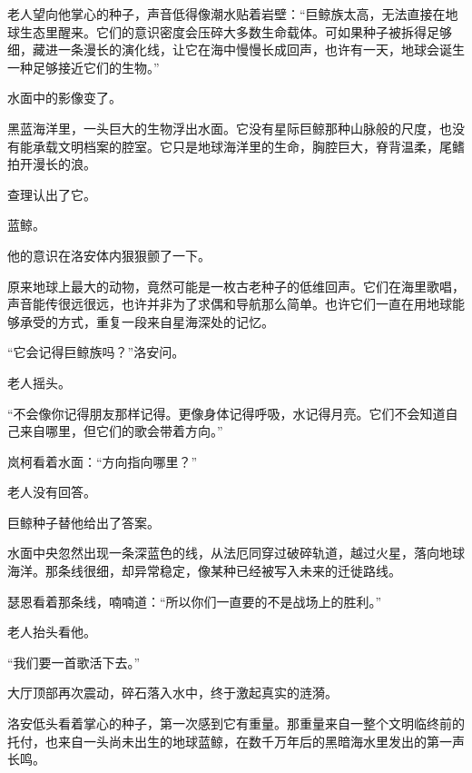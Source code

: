 老人望向他掌心的种子，声音低得像潮水贴着岩壁：“巨鲸族太高，无法直接在地球生态里醒来。它们的意识密度会压碎大多数生命载体。可如果种子被拆得足够细，藏进一条漫长的演化线，让它在海中慢慢长成回声，也许有一天，地球会诞生一种足够接近它们的生物。”

水面中的影像变了。

黑蓝海洋里，一头巨大的生物浮出水面。它没有星际巨鲸那种山脉般的尺度，也没有能承载文明档案的腔室。它只是地球海洋里的生命，胸腔巨大，脊背温柔，尾鳍拍开漫长的浪。

查理认出了它。

蓝鲸。

他的意识在洛安体内狠狠颤了一下。

原来地球上最大的动物，竟然可能是一枚古老种子的低维回声。它们在海里歌唱，声音能传很远很远，也许并非为了求偶和导航那么简单。也许它们一直在用地球能够承受的方式，重复一段来自星海深处的记忆。

“它会记得巨鲸族吗？”洛安问。

老人摇头。

“不会像你记得朋友那样记得。更像身体记得呼吸，水记得月亮。它们不会知道自己来自哪里，但它们的歌会带着方向。”

岚柯看着水面：“方向指向哪里？”

老人没有回答。

巨鲸种子替他给出了答案。

水面中央忽然出现一条深蓝色的线，从法厄同穿过破碎轨道，越过火星，落向地球海洋。那条线很细，却异常稳定，像某种已经被写入未来的迁徙路线。

瑟恩看着那条线，喃喃道：“所以你们一直要的不是战场上的胜利。”

老人抬头看他。

“我们要一首歌活下去。”

大厅顶部再次震动，碎石落入水中，终于激起真实的涟漪。

洛安低头看着掌心的种子，第一次感到它有重量。那重量来自一整个文明临终前的托付，也来自一头尚未出生的地球蓝鲸，在数千万年后的黑暗海水里发出的第一声长鸣。
